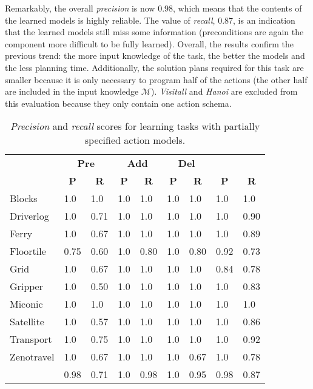 Remarkably, the overall \emph{precision} is now $0.98$, which means that the contents of the learned models is highly reliable. The value of \emph{recall}, 0.87, is an indication that the learned models still miss some information (preconditions are again the component more difficult to be fully learned). Overall, the results confirm the previous trend: the more input knowledge of the task, the better the models and the less planning time. Additionally, the solution plans required for this task are smaller because it is only necessary to program half of the actions (the other half are included in the input knowledge $\mathcal{M}$). {\em Visitall} and {\em Hanoi} are excluded from this evaluation because they only contain one action schema.

\begin{table}[hbt!]
\begin{footnotesize}
	\begin{center}
		
		\begin{tabular}{l|l|l|l|l|l|l||l|l|}
			 & \multicolumn{2}{|c|}{\bf Pre} & \multicolumn{2}{|c|}{\bf Add} & \multicolumn{2}{|c||}{\bf Del} & \multicolumn{2}{|c}{\bf}\\ \cline{2-9}			
			  & \multicolumn{1}{|c|}{\bf P} & \multicolumn{1}{|c|}{\bf R} & \multicolumn{1}{|c|}{\bf P} & \multicolumn{1}{|c|}{\bf R} & \multicolumn{1}{|c|}{\bf P} & \multicolumn{1}{|c||}{\bf R} &  \multicolumn{1}{|c|}{\bf P} & \multicolumn{1}{|c|}{\bf R} \\
			\hline
				Blocks & 1.0 & 1.0 & 1.0 & 1.0 & 1.0 & 1.0 & 1.0 & 1.0 \\
				Driverlog & 1.0 & 0.71 & 1.0 & 1.0 & 1.0 & 1.0 & 1.0 & 0.90 \\
				Ferry & 1.0 & 0.67 & 1.0 & 1.0 & 1.0 & 1.0 & 1.0 & 0.89 \\
				Floortile & 0.75 & 0.60 & 1.0 & 0.80 & 1.0 & 0.80 & 0.92 & 0.73 \\
                Grid & 1.0 & 0.67 & 1.0 & 1.0 & 1.0 & 1.0 & 0.84 & 0.78 \\
				Gripper & 1.0 & 0.50 & 1.0 & 1.0 & 1.0 & 1.0 & 1.0 & 0.83 \\
				Miconic & 1.0 & 1.0 & 1.0 & 1.0 & 1.0 & 1.0 & 1.0 & 1.0 \\
				Satellite & 1.0 & 0.57 & 1.0 & 1.0 & 1.0 & 1.0 & 1.0 & 0.86 \\
				Transport & 1.0 & 0.75 & 1.0 & 1.0 & 1.0 & 1.0 & 1.0 & 0.92 \\
				Zenotravel & 1.0 & 0.67 & 1.0 & 1.0 & 1.0 & 0.67 & 1.0 & 0.78 \\
				\hline
				\bf  & 0.98 & 0.71 & 1.0 & 0.98 & 1.0 & 0.95 & 0.98 & 0.87 \\
			\end{tabular}
		
	\end{center}
\end{footnotesize}
\caption{\small {\em Precision} and {\em recall} scores for learning tasks with partially specified action models.}
\label{tab:results_plans_partial}
\end{table}

